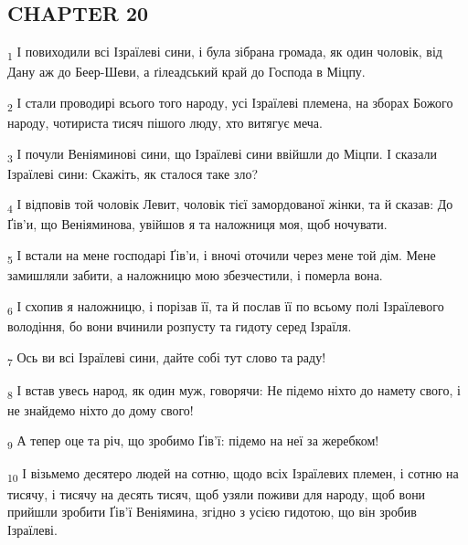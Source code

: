 \subsection{CHAPTER 20}
\begin{tcolorbox}
\textsubscript{1} І повиходили всі Ізраїлеві сини, і була зібрана громада, як один чоловік, від Дану аж до Беер-Шеви, а ґілеадський край до Господа в Міцпу.
\end{tcolorbox}
\begin{tcolorbox}
\textsubscript{2} І стали проводирі всього того народу, усі Ізраїлеві племена, на зборах Божого народу, чотириста тисяч пішого люду, хто витягує меча.
\end{tcolorbox}
\begin{tcolorbox}
\textsubscript{3} І почули Веніяминові сини, що Ізраїлеві сини ввійшли до Міцпи. І сказали Ізраїлеві сини: Скажіть, як сталося таке зло?
\end{tcolorbox}
\begin{tcolorbox}
\textsubscript{4} І відповів той чоловік Левит, чоловік тієї замордованої жінки, та й сказав: До Ґів'и, що Веніяминова, увійшов я та наложниця моя, щоб ночувати.
\end{tcolorbox}
\begin{tcolorbox}
\textsubscript{5} І встали на мене господарі Ґів'и, і вночі оточили через мене той дім. Мене замишляли забити, а наложницю мою збезчестили, і померла вона.
\end{tcolorbox}
\begin{tcolorbox}
\textsubscript{6} І схопив я наложницю, і порізав її, та й послав її по всьому полі Ізраїлевого володіння, бо вони вчинили розпусту та гидоту серед Ізраїля.
\end{tcolorbox}
\begin{tcolorbox}
\textsubscript{7} Ось ви всі Ізраїлеві сини, дайте собі тут слово та раду!
\end{tcolorbox}
\begin{tcolorbox}
\textsubscript{8} І встав увесь народ, як один муж, говорячи: Не підемо ніхто до намету свого, і не знайдемо ніхто до дому свого!
\end{tcolorbox}
\begin{tcolorbox}
\textsubscript{9} А тепер оце та річ, що зробимо Ґів'ї: підемо на неї за жеребком!
\end{tcolorbox}
\begin{tcolorbox}
\textsubscript{10} І візьмемо десятеро людей на сотню, щодо всіх Ізраїлевих племен, і сотню на тисячу, і тисячу на десять тисяч, щоб узяли поживи для народу, щоб вони прийшли зробити Ґів'ї Веніямина, згідно з усією гидотою, що він зробив Ізраїлеві.
\end{tcolorbox}
